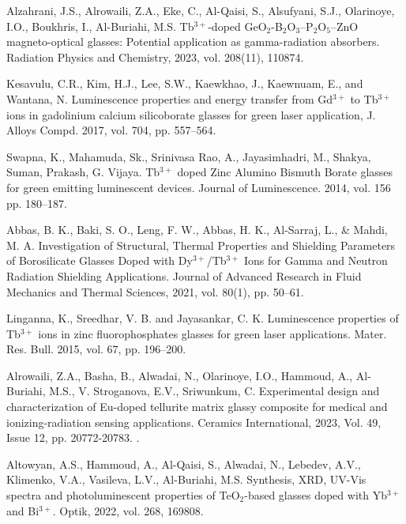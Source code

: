 \documentclass[press]{vestnik}
\begin{document}
\begin{thebibliography}{22}
Alzahrani, J.S., Alrowaili, Z.A., Eke, C., Al-Qaisi, S., Alsufyani, S.J., 
Olarinoye, I.O., Boukhris, I., Al-Buriahi, M.S. Tb$^{3+}$-doped 
GeO$_{2}$-B$_{2}$O$_{3}$--P$_{2}$O$_{5}$--ZnO magneto-optical glasses: 
Potential application as gamma-radiation absorbers. Radiation Physics and 
Chemistry, 2023, vol. 208(11), 110874.  

Kesavulu, C.R., Kim, H.J., Lee, S.W., Kaewkhao, J., Kaewnuam, E., and 
Wantana, N. Luminescence properties and energy transfer from Gd$^{3+}$ to 
Tb$^{3+}$ ions in gadolinium calcium silicoborate glasses for green laser 
application, J. Alloys Compd. 2017, vol. 704, pp. 557--564. 

Swapna, K., Mahamuda, Sk., Srinivasa Rao, A., Jayasimhadri, M., Shakya, 
Suman, Prakash, G. Vijaya. Tb$^{3+}$ doped Zinc Alumino Bismuth Borate 
glasses for green emitting luminescent devices. Journal of Luminescence. 
2014, vol. 156 pp. 180--187. 

Abbas, B. K., Baki, S. O., Leng, F. W., Abbas, H. K., Al-Sarraj, L., {\&} 
Mahdi, M. A. Investigation of Structural, Thermal Properties and Shielding 
Parameters of Borosilicate Glasses Doped with Dy$^{3+}$/Tb$^{3+}$ Ions for 
Gamma and Neutron Radiation Shielding Applications. Journal of Advanced 
Research in Fluid Mechanics and Thermal Sciences, 2021, vol. 80(1), pp. 
50--61. 

Linganna, K., Sreedhar, V. B. and Jayasankar, C. K. Luminescence 
properties of Tb$^{3+}$ ions in zinc fluorophosphates glasses for green 
laser applications. Mater. Res. Bull. 2015, vol. 67, pp. 196--200. 

Alrowaili, Z.A., Basha, B., Alwadai, N., Olarinoye, I.O., Hammoud, A., 
Al-Buriahi, M.S., V. Stroganova, E.V., Sriwunkum, C. Experimental design and 
characterization of Eu-doped tellurite matrix glassy composite for medical 
and ionizing-radiation sensing applications. Ceramics International, 2023, 
Vol. 49, Issue 12, pp. 20772-20783. .

Altowyan, A.S., Hammoud, A., Al-Qaisi, S., Alwadai, N., Lebedev, A.V., 
Klimenko, V.A., Vasileva, L.V., Al-Buriahi, M.S. Synthesis, XRD, UV-Vis 
spectra and photoluminescent properties of TeO$_{2}$-based glasses doped 
with Yb$^{3+}$ and Bi$^{3+}$. Optik, 2022, vol. 268, 169808. 


\end{thebibliography}
\end{document}
